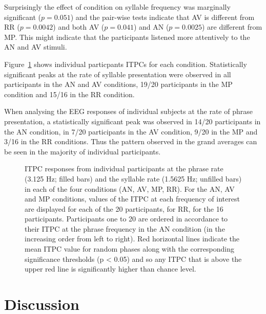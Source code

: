 \documentclass[10pt,letterpaper]{article}
\begin{document}
Surprisingly the effect of condition on syllable frequency was
marginally significant ($p=0.051$) and the pair-wise tests indicate
that AV is different from RR ($p=0.0042$) and both AV ($p=0.041$) and
AN ($p=0.0025$) are different from MP. This might indicate that the
participants listened more attentively to the AN and AV stimuli.


Figure~\ref{fig:Fig3} shows individual particpants ITPCs for each
condition. Statistically significant peaks at the rate of syllable
presentation were observed in all participants in the AN and AV
conditions, 19/20 participants in the MP condition and 15/16 in the RR
condition.

When analysing the EEG responses of individual subjects at the rate of
phrase presentation, a statistically significant peak was observed in
14/20 participants in the AN condition, in 7/20 participants in the AV
condition, 9/20 in the MP and 3/16 in the RR conditions. Thus the
pattern observed in the grand averages can be seen in the majority of
individual participants.

\begin{figure}[tbhp]

\caption{ITPC responses from individual participants at the phrase
  rate (3.125 Hz; filled bars) and the syllable rate (1.5625 Hz;
  unfilled bars) in each of the four conditions (AN, AV, MP, RR). For
  the AN, AV and MP conditions, values of the ITPC at each frequency
  of interest are displayed for each of the 20 participants, for RR,
  for the 16 participants. Participants one to 20 are ordered in
  accordance to their ITPC at the phrase frequency in the AN condition
  (in the increasing order from left to right). Red horizontal lines
  indicate the mean ITPC value for random phases along with the
  corresponding significance thresholds (p < 0.05) and so any ITPC
  that is above the upper red line is significantly higher than chance
  level.}
\label{fig:Fig3}
\end{figure}


\section*{Discussion}
\end{document}
